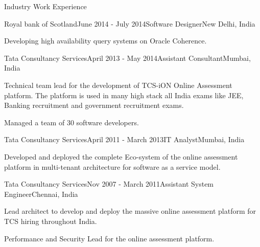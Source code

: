 \documentclass{resume} %
\begin{document}


\begin{rSection}{Industry Work Experience}
\begin{rSubsection}{Royal bank of Scotland}{June 2014 - July 2014}{Software Designer}{New Delhi, India}
\item Developing high availability query systems on Oracle Coherence.
\end{rSubsection}
\begin{rSubsection}{Tata Consultancy Services}{April 2013 - May 2014}{Assistant Consultant}{Mumbai, India}
\item Technical team lead for the development of TCS-iON Online Assessment platform. The platform is used in many high stack all India exams like JEE, Banking recruitment and government recruitment exams. 
\item Managed a team of $30$ software developers.  
\end{rSubsection}
\begin{rSubsection}{Tata Consultancy Services}{April 2011 - March 2013}{IT Analyst}{Mumbai, India}
\item Developed and deployed the complete Eco-system of the online assessment platform in multi-tenant architecture for software as a service model.
\end{rSubsection}
\begin{rSubsection}{Tata Consultancy Services}{Nov 2007 - March 2011}{Assistant System Engineer}{Chennai, India}
\item Lead architect to develop and deploy the massive online assessment platform for TCS hiring throughout India.
\item Performance and Security Lead for the online assessment platform.
\end{rSubsection}
\end{rSection}
\end{document}
